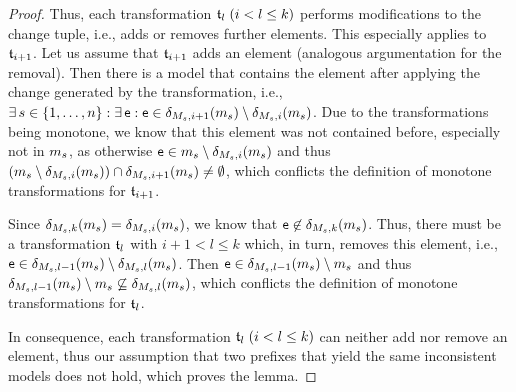 \begin{proof}
    Thus, each transformation $\transformation{t}_{l} \; (i < l \leq k)$ performs modifications to the change tuple, i.e., adds or removes further elements.
    This especially applies to $\transformation{t}_{i+1}$.
    Let us assume that $\transformation{t}_{i+1}$ adds an element (analogous argumentation for the removal).
    Then there is a model that contains the element after applying the change generated by the transformation, i.e., $\exists s \in \setted{1, \dots, n} : \exists \modelelement{e} : \modelelement{e} \in \change{\metamodel{M}{s},i+1}(\model{m}{s}) \setminus \change{\metamodel{M}{s},i}(\model{m}{s})$.
    Due to the transformations being monotone, we know that this element was not contained before, especially not in $\model{m}{s}$, as otherwise $\modelelement{e} \in \model{m}{s} \setminus \change{\metamodel{M}{s},i}(\model{m}{s})$ and thus $(\model{m}{s} \setminus \change{\metamodel{M}{s},i}(\model{m}{s})) \cap \change{\metamodel{M}{s},i+1}(\model{m}{s}) \neq \emptyset$, which conflicts the definition of monotone transformations for $\transformation{t}_{i+1}$.

    Since $\change{\metamodel{M}{s},k}(\model{m}{s}) = \change{\metamodel{M}{s},i}(\model{m}{s})$, we know that $\modelelement{e} \not\in \change{\metamodel{M}{s},k}(\model{m}{s})$.
    Thus, there must be a transformation $\transformation{t}_{l}$ with $i+1 < l \leq k$ which, in turn, removes this element, i.e., $\modelelement{e} \in \change{\metamodel{M}{s},l-1}(\model{m}{s}) \setminus \change{\metamodel{M}{s},l}(\model{m}{s})$.
    Then $\modelelement{e} \in \change{\metamodel{M}{s},l-1}(\model{m}{s}) \setminus \model{m}{s}$ and thus $\change{\metamodel{M}{s},l-1}(\model{m}{s}) \setminus \model{m}{s} \not\subseteq \change{\metamodel{M}{s},l}(\model{m}{s})$, which conflicts the definition of monotone transformations for $\transformation{t}_{l}$.

    In consequence, each transformation $\transformation{t}_{l} \; (i < l \leq k)$ can neither add nor remove an element, thus our assumption that two prefixes that yield the same inconsistent models does not hold, which proves the lemma.
\end{proof}

